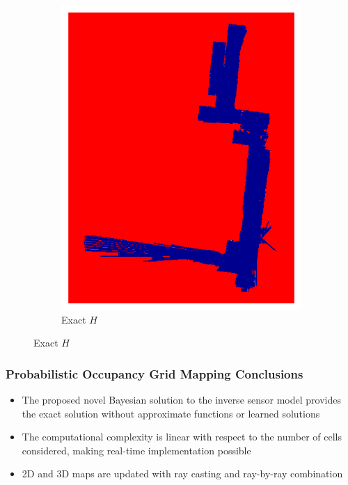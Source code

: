 \documentclass[11pt,professionalfonts,hyperref={pdftex,pdfpagemode=none,pdfstartview=FitH}]{beamer}
\begin{document}
\begin{frame}
\begin{figure}[!htbp]
\begin{subfigure}{0.2\textwidth}
        \includegraphics[width=\textwidth]{EISM_Image_inf_19.pdf}
        \caption*{Exact $H$}
    \end{subfigure}
\end{figure}

\end{frame}

\begin{frame}
\frametitle{Probabilistic Occupancy Grid Mapping Conclusions}

\begin{itemize}
	\item The proposed novel Bayesian solution to the inverse sensor model provides the exact solution without approximate functions or learned solutions
	\item The computational complexity is linear with respect to the number of cells considered, making real-time implementation possible
	\item 2D and 3D maps are updated with ray casting and ray-by-ray combination
\end{itemize}

\end{frame}
\end{document}
